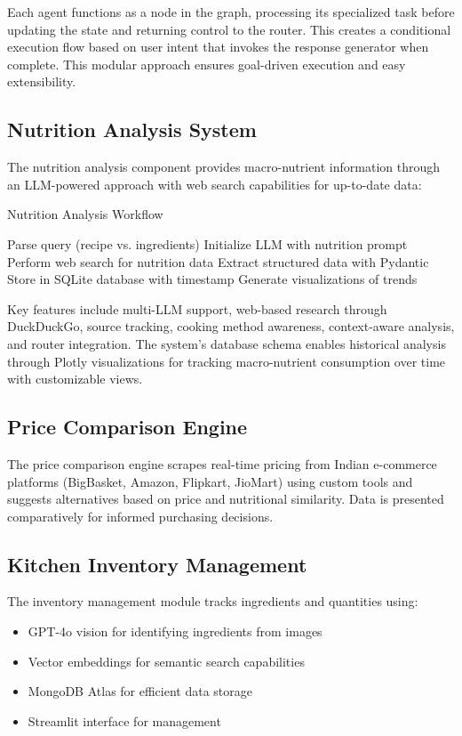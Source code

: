 \documentclass{ecai}
\begin{document}
Each agent functions as a node in the graph, processing its specialized task before updating the state and returning control to the router. This creates a conditional execution flow based on user intent that invokes the response generator when complete. This modular approach ensures goal-driven execution and easy extensibility.

\subsection{Nutrition Analysis System}

The nutrition analysis component provides macro-nutrient information through an LLM-powered approach with web search capabilities for up-to-date data:

\begin{algorithm}
\caption{Nutrition Analysis Workflow}
\begin{algorithmic}[1]
\State Parse query (recipe vs. ingredients)
\State Initialize LLM with nutrition prompt
\State Perform web search for nutrition data
\State Extract structured data with Pydantic
\State Store in SQLite database with timestamp
\State Generate visualizations of trends
\end{algorithmic}
\end{algorithm}

Key features include multi-LLM support, web-based research through DuckDuckGo, source tracking, cooking method awareness, context-aware analysis, and router integration. The system's database schema enables historical analysis through Plotly visualizations for tracking macro-nutrient consumption over time with customizable views.

\subsection{Price Comparison Engine}

The price comparison engine scrapes real-time pricing from Indian e-commerce platforms (BigBasket, Amazon, Flipkart, JioMart) using custom tools and suggests alternatives based on price and nutritional similarity. Data is presented comparatively for informed purchasing decisions.

\subsection{Kitchen Inventory Management}

The inventory management module tracks ingredients and quantities using:
\begin{itemize}[noitemsep,topsep=0pt]
    \item GPT-4o vision for identifying ingredients from images
    \item Vector embeddings for semantic search capabilities
    \item MongoDB Atlas for efficient data storage
    \item Streamlit interface for management
\end{itemize}
\end{document}
